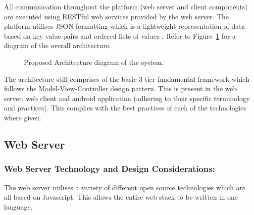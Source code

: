 \documentclass[12pt]{witseiepaper}
\begin{document}
All communication throughout the platform (web server and client components) are executed using RESTful web services provided by the web server. The platform utilises JSON formatting which is a lightweight representation of data based on key value pairs and ordered lists of values \cite{JSON}. Refer to Figure~\ref{fig:Arch} for a diagram of the overall architecture.

\begin{figure}[H]
  \caption{Proposed Architecture diagram of the system.} 
  \label{fig:Arch}
\end{figure}

The architecture still comprises of the basic 3-tier fundamental framework which follows the Model-View-Controller design pattern. This is present in the web server, web client and android application (adhering to their specific terminology and practices). This complies with the best practices of each of the technologies where given.


\subsection{Web Server}
\subsubsection{Web Server Technology and Design Considerations:} 
The web server utilises a variety of different open source technologies which are all based on Javascript. This allows the entire web stack to be written in one language.
\end{document}
